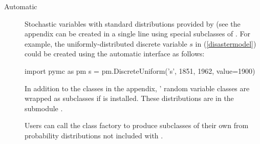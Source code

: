 \documentclass[]{jss}
\begin{document}
\begin{description}
    \item[Automatic] Stochastic variables with standard distributions provided by  (see the appendix can be created in a single line using special subclasses of . For example, the uniformly-distributed discrete variable $s$ in (\ref{disastermodel}) could be created using the automatic interface as follows:
\begin{CodeInput}
import pymc as pm
s = pm.DiscreteUniform('s', 1851, 1962, value=1900)
\end{CodeInput}

    In addition to the classes in the appendix, ' random variable classes are wrapped as  subclasses if  is installed. These distributions are in the submodule .

    Users can call the class factory  to produce  subclasses of their own from probability distributions not included with .%



\end{description}
\end{document}
